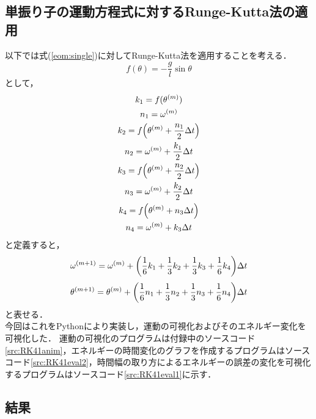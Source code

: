 \documentclass[a4paper,11pt]{jsarticle}
\begin{document}
\subsection{単振り子の運動方程式に対するRunge-Kutta法の適用}
以下では式(\ref{eom:single})に対してRunge-Kutta法を適用することを考える．
\begin{equation}
  f(\theta) = -\dfrac{g}{l}\sin{\theta}
\end{equation}
として，
\begin{gather}
  k_1 = f(\theta^{(m)}) \\
  n_1 = \omega^{(m)} \\
  k_2 = f\qty(\theta^{(m)}+\dfrac{n_1}{2}\Delta t) \\
  n_2 = \omega^{(m)} + \dfrac{k_1}{2}\Delta t \\
  k_3 = f\qty(\theta^{(m)}+\dfrac{n_2}{2}\Delta t) \\
  n_3 = \omega^{(m)} + \dfrac{k_2}{2}\Delta t \\
  k_4 = f\qty(\theta^{(m)} + n_3 \Delta t) \\
  n_4 = \omega^{(m)} + k_3 \Delta t
\end{gather}
と定義すると，
\begin{equation}
  \omega^{(m+1)} = \omega^{(m)} + \qty(\dfrac{1}{6}k_1+\dfrac{1}{3}k_2+\dfrac{1}{3}k_3+\dfrac{1}{6}k_4)\Delta t
\end{equation}
\begin{equation}
  \theta^{(m+1)} = \theta^{(m)} + \qty(\dfrac{1}{6}n_1+\dfrac{1}{3}n_2+\dfrac{1}{3}n_3+\dfrac{1}{6}n_4)\Delta t
\end{equation}
と表せる．\\
今回はこれをPythonにより実装し，運動の可視化およびそのエネルギー変化を可視化した．
運動の可視化のプログラムは付録中のソースコード\ref{src:RK41anim}，エネルギーの時間変化のグラフを作成するプログラムはソースコード\ref{src:RK41eval2}，時間幅の取り方によるエネルギーの誤差の変化を可視化するプログラムはソースコード\ref{src:RK41eval1}に示す．\\

\newpage
\subsection{結果}
\end{document}
